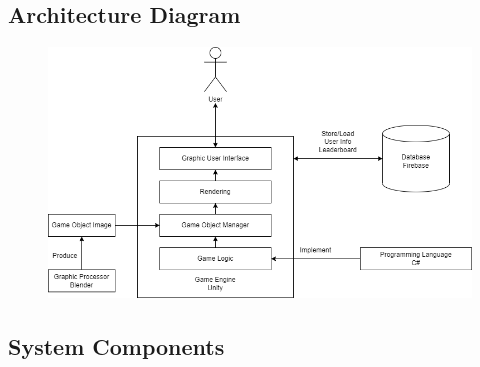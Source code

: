 \documentclass{article}
\begin{document}
\subsection{Architecture Diagram}
\begin{figure}[H]
    \centering
    \includegraphics[width=0.8\linewidth]{ArchitectureDiagram.png}
\end{figure}
\subsection{System Components}
\end{document}
